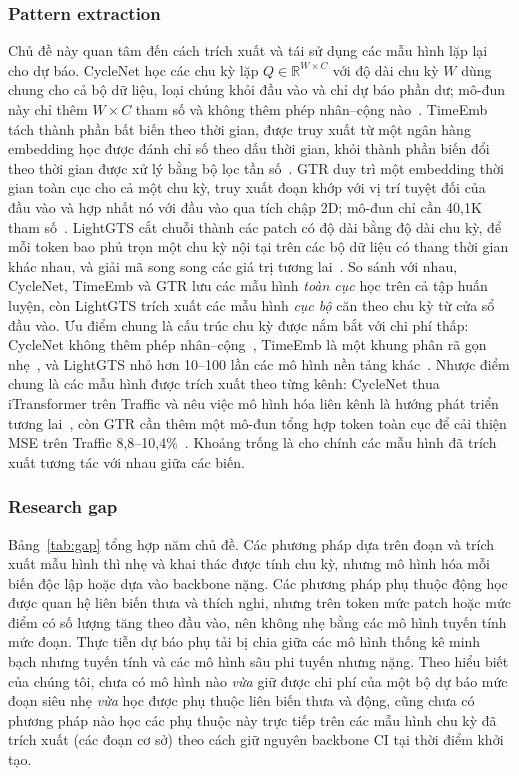 \documentclass[conference]{IEEEtran}
\newcommand{\R}{\mathbb{R}}
\begin{document}
\subsubsection{Pattern extraction}
Chủ đề này quan tâm đến cách trích xuất và tái sử dụng các mẫu hình lặp lại cho dự báo. CycleNet học các chu kỳ lặp
$Q\in\R^{W\times C}$ với độ dài chu kỳ $W$ dùng chung cho cả bộ dữ liệu, loại chúng khỏi đầu vào và chỉ dự báo phần
dư; mô-đun này chỉ thêm $W\times C$ tham số và không thêm phép nhân--cộng nào~\cite{Lin2024CycleNet}. TimeEmb tách thành
phần bất biến theo thời gian, được truy xuất từ một ngân hàng embedding học được đánh chỉ số theo dấu thời gian, khỏi thành
phần biến đổi theo thời gian được xử lý bằng bộ lọc tần số~\cite{Xia2025TimeEmb}. GTR duy trì một embedding thời gian toàn
cục cho cả một chu kỳ, truy xuất đoạn khớp với vị trí tuyệt đối của đầu vào và hợp nhất nó với đầu vào qua tích chập 2D;
mô-đun chỉ cần 40,1K tham số~\cite{Cao2026GTR}. LightGTS cắt chuỗi thành các patch có độ dài bằng độ dài chu kỳ, để mỗi
token bao phủ trọn một chu kỳ nội tại trên các bộ dữ liệu có thang thời gian khác nhau, và giải mã song song các giá trị
tương lai~\cite{Wang2025LightGTS}. So sánh với nhau, CycleNet, TimeEmb và GTR lưu các mẫu hình \emph{toàn cục} học trên
cả tập huấn luyện, còn LightGTS trích xuất các mẫu hình \emph{cục bộ} căn theo chu kỳ từ cửa sổ đầu vào. Ưu điểm chung là
cấu trúc chu kỳ được nắm bắt với chi phí thấp: CycleNet không thêm phép nhân--cộng~\cite{Lin2024CycleNet}, TimeEmb là một
khung phân rã gọn nhẹ~\cite{Xia2025TimeEmb}, và LightGTS nhỏ hơn 10--100 lần các mô hình nền tảng
khác~\cite{Wang2025LightGTS}. Nhược điểm chung là các mẫu hình được trích xuất theo từng
kênh: CycleNet thua iTransformer trên Traffic và nêu việc mô hình hóa liên kênh là hướng phát triển
tương lai~\cite{Lin2024CycleNet}, còn GTR cần thêm một mô-đun tổng hợp token toàn cục để cải thiện MSE trên Traffic
8,8--10,4\%~\cite{Cao2026GTR}. Khoảng trống là cho chính các mẫu hình đã trích xuất tương tác với nhau giữa các biến.

\subsubsection{Research gap}
Bảng~\ref{tab:gap} tổng hợp năm chủ đề. Các phương pháp dựa trên đoạn và trích xuất mẫu hình thì nhẹ và khai thác được
tính chu kỳ, nhưng mô hình hóa mỗi biến độc lập hoặc dựa vào backbone nặng. Các phương pháp phụ thuộc động học được quan
hệ liên biến thưa và thích nghi, nhưng trên token mức patch hoặc mức điểm có số lượng tăng theo đầu vào, nên không nhẹ
bằng các mô hình tuyến tính mức đoạn. Thực tiễn dự báo phụ tải bị chia giữa các mô hình thống kê minh bạch nhưng tuyến
tính và các mô hình sâu phi tuyến nhưng nặng. Theo hiểu biết của chúng tôi, chưa có mô hình nào \emph{vừa} giữ được chi phí
của một bộ dự báo mức đoạn siêu nhẹ \emph{vừa} học được phụ thuộc liên biến thưa và động, cũng chưa có phương pháp nào
học các phụ thuộc này trực tiếp trên các mẫu hình chu kỳ đã trích xuất (các đoạn cơ sở) theo cách giữ nguyên backbone CI
tại thời điểm khởi tạo.
\end{document}

